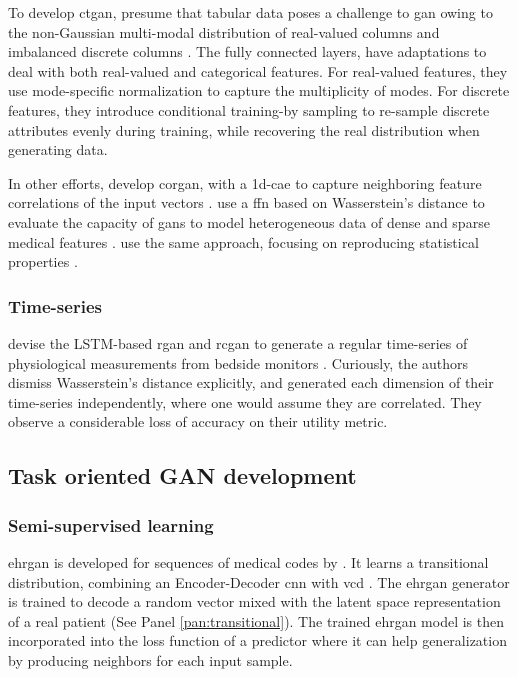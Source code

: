             To develop \gls{ctgan}, \citeauthor{Xu2019-ay} presume that tabular data poses a challenge to \gls{gan} owing to the non-Gaussian multi-modal distribution of real-valued columns and imbalanced discrete columns \cite{Xu2019-ay}. The fully connected layers, have adaptations to deal with both real-valued and categorical features. For real-valued features, they use mode-specific normalization to capture the multiplicity of modes. For discrete features, they introduce conditional training-by sampling to re-sample discrete attributes evenly during training, while recovering the real distribution when generating data.\par
            
            In other efforts, \citeauthor{torfi2019generating} develop \gls{corgan}, with a \gls{1d-cae} to capture neighboring feature correlations of the input vectors \cite{torfi2019generating}. \citeauthor{chincheong2020generation} use a \gls{ffn} based on Wasserstein's distance to evaluate the capacity of \glspl{gan} to model heterogeneous data of dense and sparse medical features \cite{chincheong2020generation}. \citeauthor{ozyigit2020generation} use the same approach, focusing on reproducing statistical properties \cite{ozyigit2020generation}.
            
        \subsubsection{Time-series}
            
             \citeauthor{esteban2017real} devise the LSTM-based \gls{rgan} and \gls{rcgan} to generate a regular time-series of physiological measurements from bedside monitors \cite{esteban2017real}. Curiously, the authors dismiss Wasserstein's distance explicitly, and generated each dimension of their time-series independently, where one would assume they are correlated. They observe a considerable loss of accuracy  on their utility metric. 

    \subsection{Task oriented GAN development}
        \subsubsection{Semi-supervised learning}

            \gls{ehrgan} is developed for sequences of medical codes by \citeauthor{Che_2017}. It learns a transitional distribution, combining an Encoder-Decoder \gls{cnn} \cite{Rankin2020} with \gls{vcd} \cite{Che_2017}. The \gls{ehrgan} generator is trained to decode a random vector mixed with the latent space representation of a real patient (See Panel \ref{pan:transitional}). The trained \gls{ehrgan} model is then incorporated into the loss function of a predictor where it can help generalization by producing neighbors for each input sample.\par
            
